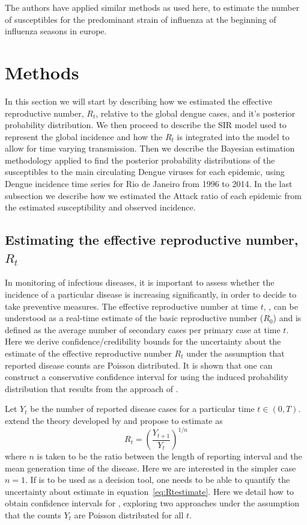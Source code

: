 The authors have applied similar methods as used here, to estimate the number 
of susceptibles for the predominant strain of influenza at the beginning of  
influenza seasons in europe\cite{pone2011}.


\section*{Methods}

In this section we will start by describing how we estimated the effective 
reproductive number, $R_t$, relative to the global dengue cases, and it's 
posterior probability distribution. 
We then proceed to describe the SIR model 
used to represent the global incidence and how the $R_t$ is integrated into the 
model to allow for time varying transmission. 
Then we describe the Bayesian 
estimation methodology applied to find the posterior probability distributions 
of the susceptibles to the main circulating Dengue viruses for each epidemic, 
using Dengue incidence time series for Rio de Janeiro from 1996 to 2014.
In the last subsection we describe how we estimated the Attack ratio of each 
epidemic from the estimated susceptibility and observed incidence.

\subsection*{Estimating the effective reproductive number, $R_t$}

In monitoring of infectious diseases, it is important to assess whether the 
incidence of a  particular disease is increasing significantly, in order to 
decide to take preventive measures.
The effective reproductive number at time $t$, \rr, can be understood as a 
real-time estimate of the basic reproductive number ($R_{0}$) and is defined as 
the average number of secondary cases per primary case at time $t$.
Here we derive confidence/credibility bounds for the uncertainty about the 
estimate of the effective reproductive number $R_t$ under the assumption that 
reported disease counts are Poisson distributed.
It is shown that one can construct a conservative confidence interval for \rr 
using the induced probability distribution that results from the approach of 
\cite{mantel}.

Let $Y_t$ be the number of reported disease cases for a particular time $t \in 
(0, T)$.
\cite{nishiura} extend the theory developed by \cite{stallybrass} and propose 
to estimate \rr as
\begin{equation}
\label{eq:Rtestimate}
R_t = \left( \frac{Y_{t+1}}{Y_t}\right)^{1/n}
\end{equation}
where $n$ is taken to be the ratio between the length of reporting interval and 
the mean generation time of the disease.
Here we are interested in the simpler case $n=1$.
If \rr is to be used as a decision tool, one needs to be able to quantify the 
uncertainty about estimate in equation~\ref{eq:Rtestimate}. 
Here we detail how to obtain confidence intervals for \rr, exploring two 
approaches under the assumption that the counts $Y_t$ are Poisson distributed 
for all $t$.

